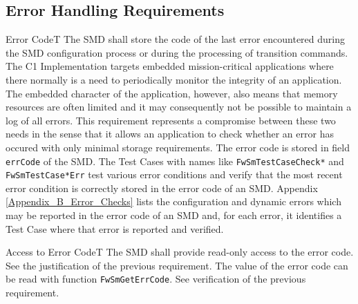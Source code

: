 \documentclass[a4paper,10pt]{article}
\newenvironment{fw_req}[6]
{\addtocounter{subsubsection}{1}
	\hspace{0.2cm}\textbf{FW-\arabic{section}.\arabic{subsection}.\arabic{subsubsection}/#2
	\hspace{0.8cm} #1}
	\vspace{-10pt}
\begin{longtable}{p{2.7cm}P{8.5cm}}
\hline
\textsc{Requirement} & #3 \\
\textsc{Justification} & #4 \\
\textsc{Implementation} & #5  \\ 
\textsc{Verification} & #6  \\
\hline
}
{\end{longtable}}
\begin{document}
\subsection{Error Handling Requirements}\label{req:errorCode}

\begin{fw_req}{Error Code}{T}
{The SMD shall store the code of the last error encountered 
during the SMD configuration process or during the processing of transition commands.}
{The C1 Implementation targets embedded mission-critical 
applications where there normally is a need to periodically monitor the integrity of an
application. 
The embedded character of the application, however, also means that memory resources are 
often limited and it may consequently not be possible to maintain a log of all errors. 
This requirement represents a compromise between these two needs in the sense that it allows 
an application to check whether an error has occured with only minimal storage requirements.}
{The error code is stored in field \texttt{errCode} of the SMD.} 
{The Test Cases with names like \texttt{FwSmTestCaseCheck*} 
and \texttt{FwSmTestCase*Err} test various error conditions and verify that the most 
recent error condition is correctly stored in the error code of an SMD. 
Appendix \ref{Appendix_B_Error_Checks} lists the configuration and dynamic errors which 
may be reported in the error code of an SMD and, for each error, it identifies a Test Case 
where that error is reported and verified.}
\end{fw_req}


\begin{fw_req}{Access to Error Code}{T}
{The SMD shall provide read-only access to the error code.}
{See the justification of the previous requirement.}
{The value of the error code can be read with function \texttt{FwSmGetErrCode}.} 
{See verification of the previous requirement.}
\end{fw_req}
\end{document}
